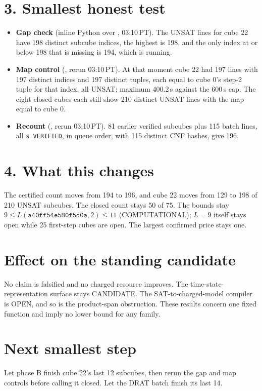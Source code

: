 \documentclass[11pt]{article}
\begin{document}
\section*{3. Smallest honest test}
\begin{itemize}
\item \textbf{Gap check} (inline Python over , 03:10\,PT). The UNSAT lines for cube 22 have 198 distinct subcube indices, the highest is 198, and the only index at or below 198 that is missing is 194, which is running.
\item \textbf{Map control} (, rerun 03:10\,PT). At that moment cube 22 had 197 lines with 197 distinct indices and 197 distinct tuples, each equal to cube 0's step-2 tuple for that index, all UNSAT; maximum 400.2\,s against the 600\,s cap. The eight closed cubes each still show 210 distinct UNSAT lines with the map equal to cube 0.
\item \textbf{Recount} (, rerun 03:10\,PT). 81 earlier verified subcubes plus 115 batch lines, all \texttt{s VERIFIED}, in queue order, with 115 distinct CNF hashes, give 196.
\end{itemize}

\section*{4. What this changes}
The certified count moves from 194 to 196, and cube 22 moves from 129 to 198 of 210 UNSAT subcubes. The closed count stays 50 of 75. The bounds stay $9\le L(\texttt{a40ff54e580f5d0a},2)\le 11$ (COMPUTATIONAL); $L=9$ itself stays open while 25 first-step cubes are open. The largest confirmed price stays one.

\section*{Effect on the standing candidate}
No claim is falsified and no charged resource improves. The time-state-representation surface stays CANDIDATE. The SAT-to-charged-model compiler is OPEN, and so is the product-span obstruction. These results concern one fixed function and imply no lower bound for any family.

\section*{Next smallest step}
Let phase B finish cube 22's last 12 subcubes, then rerun the gap and map controls before calling it closed. Let the DRAT batch finish its last 14.
\end{document}

